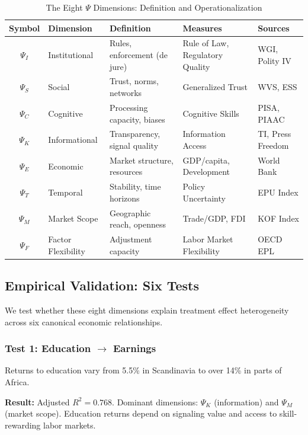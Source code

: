 \begin{table}[htbp]
\centering
\caption{The Eight $\Psi$ Dimensions: Definition and Operationalization}
\label{tab:psi-dimensions-appv}
\small
\begin{tabular}{@{}cllll@{}}
\toprule
\textbf{Symbol} & \textbf{Dimension} & \textbf{Definition} & \textbf{Measures} & \textbf{Sources} \\
\midrule
$\Psi_I$ & Institutional & Rules, enforcement (de jure) & Rule of Law, Regulatory Quality & WGI, Polity IV \\
$\Psi_S$ & Social & Trust, norms, networks & Generalized Trust & WVS, ESS \\
$\Psi_C$ & Cognitive & Processing capacity, biases & Cognitive Skills & PISA, PIAAC \\
$\Psi_K$ & Informational & Transparency, signal quality & Information Access & TI, Press Freedom \\
$\Psi_E$ & Economic & Market structure, resources & GDP/capita, Development & World Bank \\
$\Psi_T$ & Temporal & Stability, time horizons & Policy Uncertainty & EPU Index \\
$\Psi_M$ & Market Scope & Geographic reach, openness & Trade/GDP, FDI & KOF Index \\
$\Psi_F$ & Factor Flexibility & Adjustment capacity & Labor Market Flexibility & OECD EPL \\
\bottomrule
\end{tabular}
\end{table}

\subsection{Empirical Validation: Six Tests}
\label{sec:V-validation}

We test whether these eight dimensions explain treatment effect heterogeneity across six canonical economic relationships.

\subsubsection{Test 1: Education $\rightarrow$ Earnings}

Returns to education vary from 5.5\% in Scandinavia to over 14\% in parts of Africa. 

\textbf{Result:} Adjusted $R^2 = 0.768$. Dominant dimensions: $\Psi_K$ (information) and $\Psi_M$ (market scope). Education returns depend on signaling value and access to skill-rewarding labor markets.

